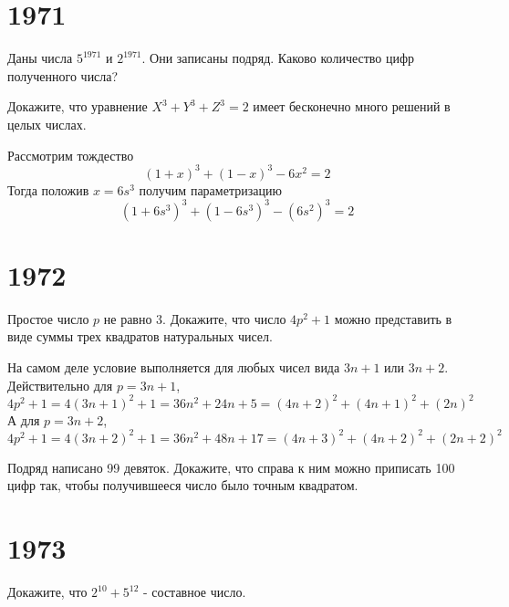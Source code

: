 \documentclass[11pt, a4paper]{template}
\begin{document}
\chapter{1971}

\begin{exercise}
Даны числа $5^{1971}$ и $2^{1971}$. Они записаны подряд. Каково количество цифр полученного числа?
\end{exercise}

\begin{exercise}
Докажите, что уравнение $X^{3} + Y^{3} + Z^{3} = 2$ имеет бесконечно много решений в целых числах.
\end{exercise}

\begin{solution}
Рассмотрим тождество
$$
(1+x)^{3} + (1-x)^{3} - 6x^{2} = 2
$$
Тогда положив $x = 6s^{3}$ получим параметризацию
$$
(1+6s^{3})^{3} + (1-6s^{3})^{3} - (6s^{2})^{3} = 2
$$ 
\end{solution}

\chapter{1972}

\begin{exercise}
Простое число $p$ не равно 3. Докажите, что число $4p^{2} + 1$ можно представить в виде суммы трех квадратов натуральных чисел.
\end{exercise}

\begin{solution}
На самом деле условие выполняется для любых чисел вида $3n+1$ или $3n+2$. Действительно для $p = 3n+1$,
$$
4p^{2} + 1 = 4(3n+1)^{2} + 1 = 36n^{2}+24n+5 = (4n+2)^{2}+(4n+1)^{2}+(2n)^{2}
$$
А для $p = 3n + 2$,
$$
4p^{2} + 1 = 4(3n+2)^{2} + 1 = 36n^{2} + 48n + 17 = (4n + 3)^{2} + (4n + 2)^{2} + (2n + 2)^{2}
$$
\end{solution}

\begin{exercise}
Подряд написано 99 девяток. Докажите, что справа к ним можно приписать 100 цифр так, чтобы получившееся число было точным квадратом.
\end{exercise}

\chapter{1973}

\begin{exercise}
Докажите, что $2^{10} + 5^{12}$ - составное число.
\end{exercise}
\end{document}
